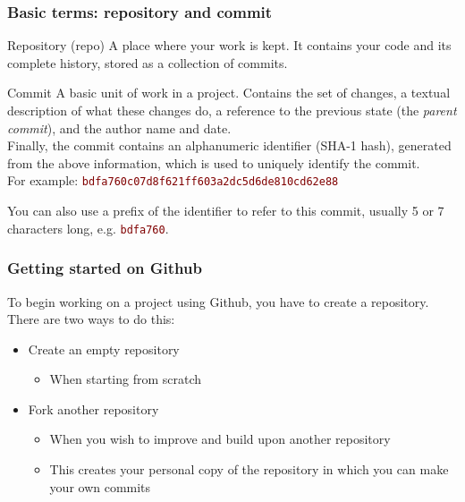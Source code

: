 
\begin{frame}

\frametitle{Basic terms: repository and commit}
\begin{block}{Repository (repo)}
	A place where your work is kept. It contains your code and its complete history, stored as a collection of commits.
\end{block}

\begin{block}{Commit}
	A basic unit of work in a project. Contains the set of changes, a textual description of what these changes do, a reference to the previous state (the \textit{parent commit}), and the author name and date.\\ \smallskip Finally, the commit contains an alphanumeric identifier (SHA-1 hash), generated from the above information, which is used to uniquely identify the commit. \\For example: \textcolor{Maroon}{\texttt{bdfa760c07d8f621ff603a2dc5d6de810cd62e88}}
\smallskip

You can also use a prefix of the identifier to refer to this commit, usually 5 or 7 characters long, e.g. \textcolor{Maroon}{\texttt{bdfa760}}.
\end{block}
\end{frame}


\begin{frame}

\frametitle{Getting started on Github}

To begin working on a project using Github, you have to create a repository. There are two ways to do this:


\begin{itemize}
	\item Create an empty repository
	\begin{itemize}
	\item When starting from scratch
	\end{itemize}	
	
	\medskip
	\item Fork another repository
	\begin{itemize}
	\item When you wish to improve and build upon another repository
	\item This creates your personal copy of the repository in which you can make your own commits
	\end{itemize}
\end{itemize}

\end{frame}

